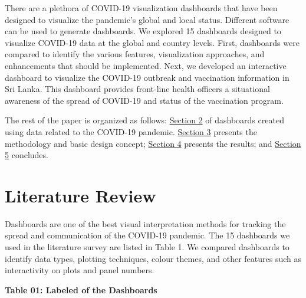 \documentclass[
]{article}
\begin{document}
There are a plethora of COVID-19 visualization dashboards that have been
designed to visualize the pandemic's global and local status. Different
software can be used to generate dashboards. We explored 15 dashboards
designed to visualize COVID-19 data at the global and country levels.
First, dashboards were compared to identify the various features,
visualization approaches, and enhancements that should be implemented.
Next, we developed an interactive dashboard to visualize the COVID-19
outbreak and vaccination information in Sri Lanka. This dashboard
provides front-line health officers a situational awareness of the
spread of COVID-19 and status of the vaccination program.

The rest of the paper is organized as follows:
\protect\hyperlink{litreview}{Section 2} of dashboards created using
data related to the COVID-19 pandemic.
\protect\hyperlink{methods}{Section 3} presents the methodology and
basic design concept; \protect\hyperlink{results}{Section 4} presents
the results; and \protect\hyperlink{ux5cux2520conclusion}{Section 5}
concludes.

\hypertarget{litreview}{%
\section{Literature Review}\label{litreview}}

Dashboards are one of the best visual interpretation methods for
tracking the spread and communication of the COVID-19 pandemic. The 15
dashboards we used in the literature survey are listed in Table 1. We
compared dashboards to identify data types, plotting techniques, colour
themes, and other features such as interactivity on plots and panel
numbers.

\textbf{Table 01: Labeled of the Dashboards}
\end{document}
